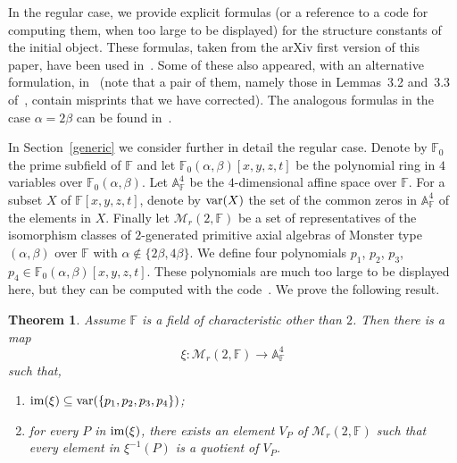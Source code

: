 \documentclass[a4paper]{amsart}
\newtheorem{theorem}[lemma]{Theorem}
\newcommand{\Var}{{\rm var}}
\newcommand{\F}{{\mathbb F}}
\newcommand{\im}{\rm im}
\newcommand{\al}{\alpha}
\newcommand{\bt}{\beta}
\begin{document}
In the regular case, we provide explicit formulas (or a reference to a code for computing them, when too large to be displayed) for the structure constants of the initial object. These formulas, taken from the arXiv first version of this paper, have been used in~\cite{turner1, turner2}. Some of these also appeared, with an alternative formulation, in~\cite{R} (note that  a pair of them, namely those in Lemmas~3.2 and~3.3 of~\cite{R}, contain misprints that we have corrected). The analogous formulas in the case $\al=2\bt$ can be found in~\cite{FMS2}.


In Section~\ref{generic} we consider further in detail the regular case. Denote by $\F_0$ the prime subfield of $\F$ and let $\F_0(\alpha, \beta)[x, y, z, t]$ be the polynomial ring in $4$ variables over $\F_0(\alpha, \beta)$. Let $\mathbb A_\F^4$ be the $4$-dimensional affine space over $\F$. For a subset $X$ of $\F[x, y, z, t]$, denote  by $\Var(X)$ 
the set of the common zeros in $\mathbb A_\F^4$ of the elements in $X$. Finally 
let ${\mathcal M_r}(2, \F)$ be a set of representatives of the isomorphism classes of  $2$-generated primitive axial algebras of Monster type $(\alpha, \beta)$ over $\F$ with  $\alpha\not \in \{2\beta, 4\beta\}$. We define four polynomials $p_1$, $p_2$, $p_3$, $p_4\in \F_0(\alpha, \beta)[x, y, z, t]$. These polynomials are much too large to be displayed here, but they can be computed with the code~\cite[genericsakuma.s]{code}.
We prove the following result.

\begin{theorem}\label{nec}
Assume $\F$ is a field of characteristic other than $2$. Then there is a map $$\xi\colon {\mathcal M_r}(2, \F)\to \mathbb A_\F^4$$ 
such that, 
\begin{enumerate}
\item ${\im} (\xi)\subseteq {\Var}(\{p_1, p_2, p_3, p_4\})$;
\item for every $P$ in $\im (\xi)$, there exists an element $V_P$ of  ${\mathcal M_r}(2, \F)$ such that every element in $\xi^{-1}(P)$ is a quotient of $V_P$.
\end{enumerate} 
\end{theorem}
\end{document}
